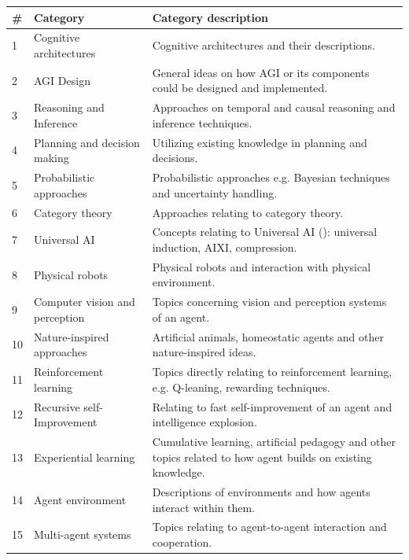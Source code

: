 \documentclass[utf8,english]{gradu3}
\begin{document}
\begin{table}[H]
  \footnotesize
  \centering
  \begin{tabular}{p{0.05\linewidth} p{0.30\linewidth} p{0.65\linewidth}}

    \textbf{\#} & \textbf{Category}  & \textbf{Category description}  \\ \hline
    1  & Cognitive architectures & Cognitive architectures and their descriptions.  \\ \hline
    2  & AGI Design & General ideas on how AGI or its components could be designed and implemented. \\ \hline
    3	 & Reasoning and Inference &  Approaches on temporal and causal reasoning and inference techniques. \\ \hline
    4	 & Planning and decision making & Utilizing existing knowledge in planning and decisions. \\ \hline
    5	 & Probabilistic approaches & Probabilistic approaches e.g. Bayesian techniques and uncertainty handling.\\ \hline
    6	 & Category theory & Approaches relating to category theory.\\ \hline
    7	 & Universal AI & Concepts relating to Universal AI (\cite{hutter2004}): universal induction, AIXI, compression.\\ \hline
    8	 & Physical robots & Physical robots and interaction with physical environment. \\ \hline
    9	 & Computer vision and perception & Topics concerning vision and perception systems of an agent.\\ \hline
    10 & Nature-inspired approaches & Artificial animals, homeostatic agents and other nature-inspired ideas.\\ \hline
    11 & Reinforcement learning & Topics directly relating to reinforcement learning, e.g. Q-leaning, rewarding techniques.\\ \hline
    12 & Recursive self-Improvement & Relating to fast self-improvement of an agent and intelligence explosion. \\ \hline
    13 & Experiential learning & Cumulative learning, artificial pedagogy and other topics related to how agent builds on existing knowledge.\\ \hline
    14 & Agent environment & Descriptions of environments and how agents interact within them.\\ \hline
    15 & Multi-agent systems & Topics relating to agent-to-agent interaction and cooperation.\\ \hline

\end{tabular}
\end{table}
\end{document}

